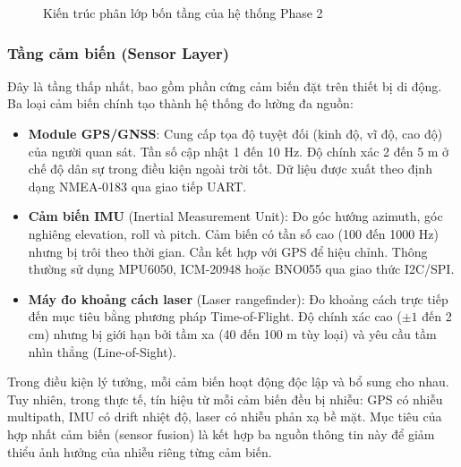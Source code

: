 \begin{figure}[H]
{
}
\caption{Kiến trúc phân lớp bốn tầng của hệ thống Phase 2}
\label{fig:phase2-arch}
\end{figure}

\subsubsection{Tầng cảm biến (Sensor Layer)}

\hspace{0.5cm} Đây là tầng thấp nhất, bao gồm phần cứng cảm biến đặt trên thiết bị di động. Ba loại cảm biến chính tạo thành hệ thống đo lường đa nguồn:

\begin{itemize}
    \item \textbf{Module GPS/GNSS}: Cung cấp tọa độ tuyệt đối (kinh độ, vĩ độ, cao độ) của người quan sát. Tần số cập nhật 1 đến 10 Hz. Độ chính xác 2 đến 5 m ở chế độ dân sự trong điều kiện ngoài trời tốt. Dữ liệu được xuất theo định dạng NMEA-0183 qua giao tiếp UART.
    \item \textbf{Cảm biến IMU} (Inertial Measurement Unit): Đo góc hướng azimuth, góc nghiêng elevation, roll và pitch. Cảm biến có tần số cao (100 đến 1000 Hz) nhưng bị trôi theo thời gian. Cần kết hợp với GPS để hiệu chỉnh. Thông thường sử dụng MPU6050, ICM-20948 hoặc BNO055 qua giao thức I2C/SPI.
    \item \textbf{Máy đo khoảng cách laser} (Laser rangefinder): Đo khoảng cách trực tiếp đến mục tiêu bằng phương pháp Time-of-Flight. Độ chính xác cao ($\pm 1$ đến 2 cm) nhưng bị giới hạn bởi tầm xa (40 đến 100 m tùy loại) và yêu cầu tầm nhìn thẳng (Line-of-Sight).
\end{itemize}

Trong điều kiện lý tưởng, mỗi cảm biến hoạt động độc lập và bổ sung cho nhau. Tuy nhiên, trong thực tế, tín hiệu từ mỗi cảm biến đều bị nhiễu: GPS có nhiễu multipath, IMU có drift nhiệt độ, laser có nhiễu phản xạ bề mặt. Mục tiêu của hợp nhất cảm biến (sensor fusion) là kết hợp ba nguồn thông tin này để giảm thiểu ảnh hưởng của nhiễu riêng từng cảm biến.


